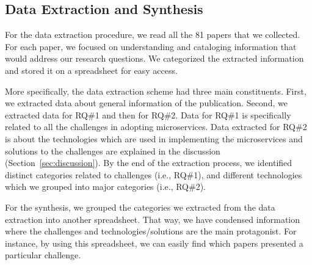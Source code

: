 \subsection{Data Extraction and Synthesis}

For the data extraction procedure, we read all the 81 papers that we collected. For each paper, we focused on understanding and cataloging information that would address our research questions. We categorized the extracted information and stored it on a spreadsheet for easy access. 

More specifically, the data extraction scheme had three main constituents. First, we extracted data about general information of the publication. Second, we extracted data for RQ\#1 and then for RQ\#2. Data for RQ\#1 is specifically related to all the challenges in adopting microservices. Data extracted for RQ\#2 is about the technologies which are used in implementing the microservices and solutions to the challenges are explained in the discussion (Section~\ref{sec:discussion}).
%
By the end of the extraction process, we identified \challengecount distinct categories related to challenges (i.e., RQ\#1), and \techcount different technologies which we grouped into \techgroupcount major categories (i.e., RQ\#2). 


For the synthesis, we grouped the categories we extracted from the data extraction into another spreadsheet. That way, we have condensed information where the challenges and technologies/solutions are the main protagonist. For instance, by using this spreadsheet, we can easily find which papers presented a particular challenge. 
%


